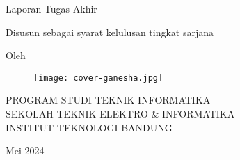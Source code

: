 \clearpage
\pagestyle{empty}

\begin{center}
  \smallskip
  
  \Large \bfseries \MakeUppercase{\thetitle}
  \vfill
  
  \Large Laporan Tugas Akhir
  \vfill
  
  \large Disusun sebagai syarat kelulusan tingkat sarjana
  \vfill
  
  \large Oleh
  
  \Large \theauthor
  
  \vfill
  \begin{figure}[h]
    \centering
    \texttt{[image: cover-ganesha.jpg]}
  \end{figure}
  \vfill
  
  \large
  \uppercase{
    Program Studi Teknik Informatika \\
    Sekolah Teknik Elektro \& Informatika \\
    Institut Teknologi Bandung
  }
  
  Mei 2024
  
\end{center}

\clearpage
